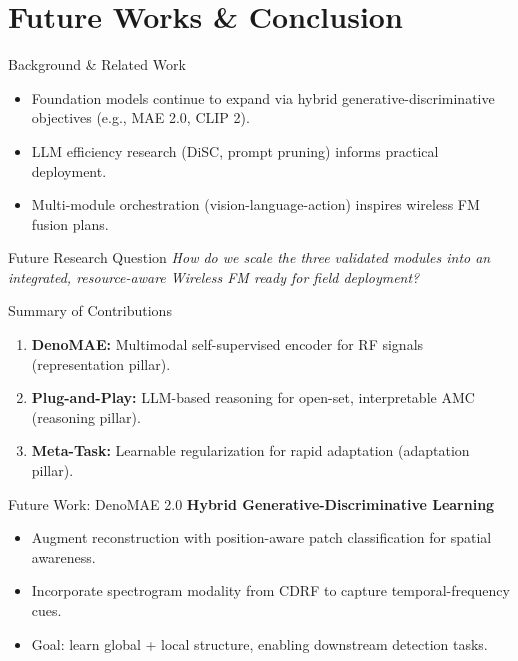 \section{Future Works \& Conclusion}

\begin{frame}{Background \& Related Work}
    \begin{itemize}
        \item Foundation models continue to expand via hybrid generative-discriminative objectives (e.g., MAE 2.0, CLIP 2).
        \item LLM efficiency research (DiSC, prompt pruning) informs practical deployment.
        \item Multi-module orchestration (vision-language-action) inspires wireless FM fusion plans.
    \end{itemize}
\end{frame}

\begin{frame}{Future Research Question}
    \centering
    \Large
    \textit{How do we scale the three validated modules into an integrated, resource-aware Wireless FM ready for field deployment?}
\end{frame}

\begin{frame}{Summary of Contributions}
    \begin{enumerate}
        \item \textbf{DenoMAE:} Multimodal self-supervised encoder for RF signals (representation pillar).
        \item \textbf{Plug-and-Play:} LLM-based reasoning for open-set, interpretable AMC (reasoning pillar).
        \item \textbf{Meta-Task:} Learnable regularization for rapid adaptation (adaptation pillar).
    \end{enumerate}
\end{frame}

\begin{frame}{Future Work: DenoMAE 2.0}
    \textbf{Hybrid Generative-Discriminative Learning}
    \begin{itemize}
        \item Augment reconstruction with position-aware patch classification for spatial awareness.
        \item Incorporate spectrogram modality from CDRF to capture temporal-frequency cues.
        \item Goal: learn global + local structure, enabling downstream detection tasks.
    \end{itemize}
\end{frame}

